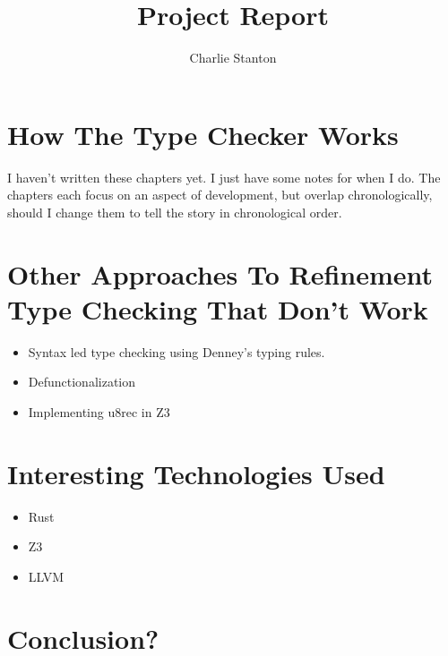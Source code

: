 \documentclass[12pt,a4paper,titlepage]{article}
\title{Project Report}
\author{Charlie Stanton}
\begin{document}
    \maketitle

    

    \section{How The Type Checker Works}
    I haven't written these chapters yet.
    I just have some notes for when I do.
    The chapters each focus on an aspect of development, but overlap chronologically, should I change
    them to tell the story in chronological order.
    \section{Other Approaches To Refinement Type Checking That Don't Work}
    \begin{itemize}
        \item Syntax led type checking using Denney's typing rules.
        \item Defunctionalization
        \item Implementing u8rec in Z3
    \end{itemize}
    \section{Interesting Technologies Used}
    \begin{itemize}
        \item Rust
        \item Z3
        \item LLVM
    \end{itemize}
    \section{Conclusion?}

    
    
\end{document}
